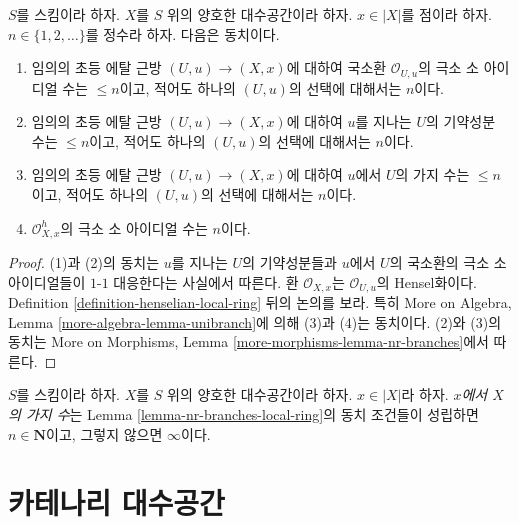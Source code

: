 \begin{lemma}
\label{lemma-nr-branches-local-ring}
$S$를 스킴이라 하자. $X$를 $S$ 위의 양호한 대수공간이라 하자.
$x \in |X|$를 점이라 하자. $n \in \{1, 2, \ldots\}$를 정수라 하자.
다음은 동치이다.
\begin{enumerate}
\item 임의의 초등 에탈 근방 $(U, u) \to (X, x)$에 대하여 국소환
$\mathcal{O}_{U, u}$의 극소 소 아이디얼 수는 $\leq n$이고,
적어도 하나의 $(U, u)$의 선택에 대해서는 $n$이다.
\item 임의의 초등 에탈 근방 $(U, u) \to (X, x)$에 대하여
$u$를 지나는 $U$의 기약성분 수는 $\leq n$이고, 적어도 하나의
$(U, u)$의 선택에 대해서는 $n$이다.
\item 임의의 초등 에탈 근방 $(U, u) \to (X, x)$에 대하여 $u$에서
$U$의 가지 수는 $\leq n$이고, 적어도 하나의 $(U, u)$의 선택에
대해서는 $n$이다.
\item $\mathcal{O}_{X, x}^h$의 극소 소 아이디얼 수는 $n$이다.
\end{enumerate}
\end{lemma}

\begin{proof}
(1)과 (2)의 동치는 $u$를 지나는 $U$의 기약성분들과 $u$에서 $U$의
국소환의 극소 소 아이디얼들이 $1$-$1$ 대응한다는 사실에서 따른다.
환 $\mathcal{O}_{X, x}$는 $\mathcal{O}_{U, u}$의 Hensel화이다.
Definition \ref{definition-henselian-local-ring} 뒤의 논의를 보라.
특히 More on Algebra, Lemma
\ref{more-algebra-lemma-unibranch}에 의해 (3)과 (4)는 동치이다.
(2)와 (3)의 동치는 More on Morphisms, Lemma
\ref{more-morphisms-lemma-nr-branches}에서 따른다.
\end{proof}

\begin{definition}
\label{definition-number-of-branches}
$S$를 스킴이라 하자. $X$를 $S$ 위의 양호한 대수공간이라 하자.
$x \in |X|$라 하자. {\it $x$에서 $X$의 가지 수}는 Lemma
\ref{lemma-nr-branches-local-ring}의 동치 조건들이 성립하면
$n \in \mathbf{N}$이고, 그렇지 않으면 $\infty$이다.
\end{definition}

\section{카테나리 대수공간}
\label{section-catenary}


